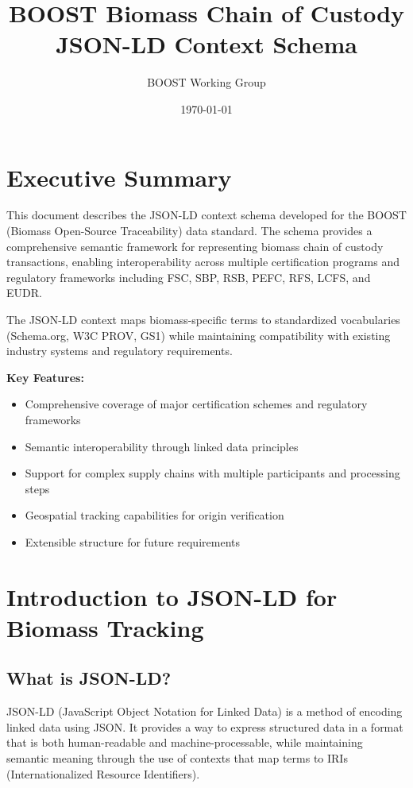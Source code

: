 \documentclass{article}
\title{BOOST Biomass Chain of Custody JSON-LD Context Schema}
\author{BOOST Working Group}
\date{\today}
\begin{document}
\maketitle

\tableofcontents
\newpage

\section{Executive Summary}

This document describes the JSON-LD context schema developed for the BOOST (Biomass Open-Source Traceability) data standard. The schema provides a comprehensive semantic framework for representing biomass chain of custody transactions, enabling interoperability across multiple certification programs and regulatory frameworks including FSC, SBP, RSB, PEFC, RFS, LCFS, and EUDR.

The JSON-LD context maps biomass-specific terms to standardized vocabularies (Schema.org, W3C PROV, GS1) while maintaining compatibility with existing industry systems and regulatory requirements.

\textbf{Key Features:}
\begin{itemize}[noitemsep]
    \item Comprehensive coverage of major certification schemes and regulatory frameworks
    \item Semantic interoperability through linked data principles
    \item Support for complex supply chains with multiple participants and processing steps
    \item Geospatial tracking capabilities for origin verification
    \item Extensible structure for future requirements
\end{itemize}

\section{Introduction to JSON-LD for Biomass Tracking}

\subsection{What is JSON-LD?}

JSON-LD (JavaScript Object Notation for Linked Data) is a method of encoding linked data using JSON. It provides a way to express structured data in a format that is both human-readable and machine-processable, while maintaining semantic meaning through the use of contexts that map terms to IRIs (Internationalized Resource Identifiers).
\end{document}
